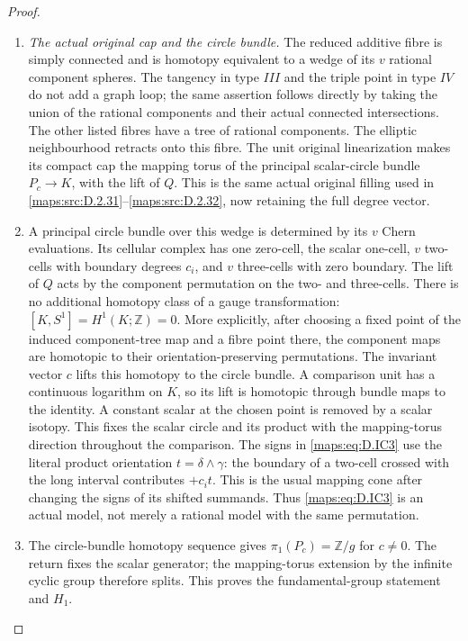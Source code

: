 \begin{proof}
\begin{enumerate}[label=\arabic*.,leftmargin=*]
\item \emph{The actual original cap and the circle bundle.}
The reduced additive fibre is simply connected and
is homotopy equivalent to a wedge of its $v$ rational
component spheres. The tangency in type $III$ and the
triple point in type $IV$ do not add a graph loop;
the same assertion follows directly by taking the
union of the rational components and their actual
connected intersections. The other listed fibres
have a tree of rational components.
The elliptic neighbourhood retracts onto this fibre.
The unit original linearization makes its compact
cap the mapping torus of the principal scalar-circle
bundle $P_c\to K$, with the lift of $Q$.
This is the same actual original filling used in
\ref{maps:src:D.2.31}--\ref{maps:src:D.2.32}, now retaining the full degree vector.

\item A principal circle bundle over this wedge is determined
by its $v$ Chern evaluations. Its cellular complex has
one zero-cell, the scalar one-cell, $v$ two-cells with
boundary degrees $c_i$, and $v$ three-cells with zero
boundary. The lift of $Q$ acts by the component
permutation on the two- and three-cells. There is no
additional homotopy class of a gauge transformation:
$[K,S^1]=H^1(K;\mathbb Z)=0$. More explicitly, after
choosing a fixed point of the induced component-tree
map and a fibre point there, the component maps are
homotopic to their orientation-preserving permutations.
The invariant vector $c$ lifts this homotopy to the
circle bundle. A comparison unit has a continuous
logarithm on $K$, so its lift is homotopic through
bundle maps to the identity. A constant scalar at
the chosen point is removed by a scalar isotopy.
This fixes the scalar circle and its product with
the mapping-torus direction throughout the comparison.
The signs in \eqref{maps:eq:D.IC3} use the literal product orientation
$t=\delta\wedge\gamma$: the boundary of a two-cell
crossed with the long interval contributes $+c_i t$.
This is the usual mapping cone after changing the signs
of its shifted summands. Thus \eqref{maps:eq:D.IC3} is an actual model, not
merely a rational model with the same permutation.

\item The circle-bundle homotopy sequence gives
$\pi_1(P_c)=\mathbb Z/g$ for $c\ne0$.
The return fixes the scalar generator; the mapping-torus
extension by the infinite cyclic group therefore splits.
This proves the fundamental-group statement and $H_1$.


\end{enumerate}
\end{proof}
